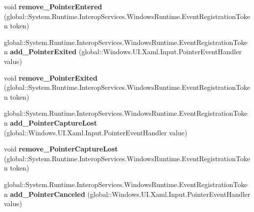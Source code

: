 \begin{DoxyCompactItemize}
\item 
\mbox{\label{interface_windows_1_1_u_i_1_1_xaml_1_1_i_u_i_element_a97fd59b642c8546d197cd5ffebe213bf}} 
void {\bfseries remove\+\_\+\+Pointer\+Entered} (global\+::\+System.\+Runtime.\+Interop\+Services.\+Windows\+Runtime.\+Event\+Registration\+Token token)
\item 
\mbox{\label{interface_windows_1_1_u_i_1_1_xaml_1_1_i_u_i_element_a692d43ef89399af622b349c4c0ac5249}} 
global\+::\+System.\+Runtime.\+Interop\+Services.\+Windows\+Runtime.\+Event\+Registration\+Token {\bfseries add\+\_\+\+Pointer\+Exited} (global\+::\+Windows.\+U\+I.\+Xaml.\+Input.\+Pointer\+Event\+Handler value)
\item 
\mbox{\label{interface_windows_1_1_u_i_1_1_xaml_1_1_i_u_i_element_a934eefa2b5181fd9b0c19d7b6536d6d9}} 
void {\bfseries remove\+\_\+\+Pointer\+Exited} (global\+::\+System.\+Runtime.\+Interop\+Services.\+Windows\+Runtime.\+Event\+Registration\+Token token)
\item 
\mbox{\label{interface_windows_1_1_u_i_1_1_xaml_1_1_i_u_i_element_a4600eed2eadce86aaa8771cc8aedbb0d}} 
global\+::\+System.\+Runtime.\+Interop\+Services.\+Windows\+Runtime.\+Event\+Registration\+Token {\bfseries add\+\_\+\+Pointer\+Capture\+Lost} (global\+::\+Windows.\+U\+I.\+Xaml.\+Input.\+Pointer\+Event\+Handler value)
\item 
\mbox{\label{interface_windows_1_1_u_i_1_1_xaml_1_1_i_u_i_element_a0e8fccaf0e69daa6bc50f43458fa846a}} 
void {\bfseries remove\+\_\+\+Pointer\+Capture\+Lost} (global\+::\+System.\+Runtime.\+Interop\+Services.\+Windows\+Runtime.\+Event\+Registration\+Token token)
\item 
\mbox{\label{interface_windows_1_1_u_i_1_1_xaml_1_1_i_u_i_element_aece41d38eee31db31fcc9ce4940bc61d}} 
global\+::\+System.\+Runtime.\+Interop\+Services.\+Windows\+Runtime.\+Event\+Registration\+Token {\bfseries add\+\_\+\+Pointer\+Canceled} (global\+::\+Windows.\+U\+I.\+Xaml.\+Input.\+Pointer\+Event\+Handler value)

\end{DoxyCompactItemize}
